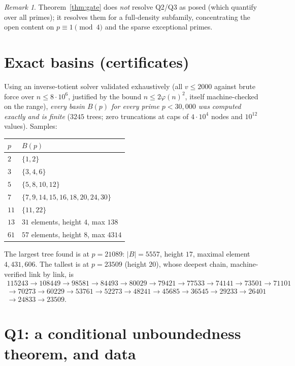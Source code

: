 \documentclass[11pt,a4paper]{article}
\theoremstyle{remark}
\newtheorem*{remark}{Remark}
\begin{document}
\begin{remark}
Theorem~\ref{thm:gate} does \emph{not} resolve Q2/Q3 as posed (which quantify over all primes); it resolves them for a full-density subfamily, concentrating the open content on $p\equiv 1\pmod 4$ and the sparse exceptional primes.
\end{remark}

\section{Exact basins (certificates)}

Using an inverse-totient solver validated exhaustively (all $v\le 2000$ against brute force over $n\le 8\cdot 10^6$, justified by the bound $n\le 2\varphi(n)^2$, itself machine-checked on the range), \emph{every basin $B(p)$ for every prime $p<30{,}000$ was computed exactly and is finite} ($3245$ trees; zero truncations at caps of $4\cdot 10^4$ nodes and $10^{12}$ values). Samples:

\begin{center}
\begin{tabular}{@{}ll@{}}
\toprule
$p$ & $B(p)$\\
\midrule
$2$ & $\{1,2\}$\\
$3$ & $\{3,4,6\}$\\
$5$ & $\{5,8,10,12\}$\\
$7$ & $\{7,9,14,15,16,18,20,24,30\}$\\
$11$ & $\{11,22\}$\\
$13$ & $31$ elements, height $4$, max $138$\\
$61$ & $57$ elements, height $8$, max $4314$\\
\bottomrule
\end{tabular}
\end{center}

The largest tree found is at $p=21089$: $|B|=5557$, height $17$, maximal element $4{,}431{,}606$. The tallest is at $p=23509$ (height $20$), whose deepest chain, machine-verified link by link, is
\begin{multline*}
115243\to 108449\to 98581\to 84493\to 80029\to 79421\to 77533\to 74141\to 73501\to 71101\\
\to 70273\to 60229\to 53761\to 52273\to 48241\to 45685\to 36545\to 29233\to 26401\\
\to 24833\to 23509.
\end{multline*}

\section{Q1: a conditional unboundedness theorem, and data}
\end{document}

